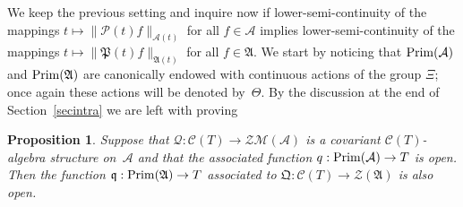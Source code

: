 \documentclass[11pt]{article}
\def\A{{\mathcal A}}
\def\Th{\Theta}
\def\AA{\mathfrak A}
\def\C{\mathcal{C}}
\def\Q{\mathcal Q}
\def\P{\mathcal P}
\def\PP{{\mathfrak P}}
\newtheorem{Proposition}[Theorem]{Proposition}
{\theoremstyle{definition}
\newtheorem{Definition}[Theorem]{Definition}
\newtheorem{Example}[Theorem]{Example}
\newtheorem{Remark}[Theorem]{Remark}
}
\begin{document}
We keep the previous setting and inquire now if lower-semi-continuity of the mappings
$t\mapsto\| \P(t)f\|_{\A(t)}$ for all $f\in\A$ implies lower-semi-continuity of the mappings
$t\mapsto\| \PP(t)f\|_{\AA(t)}$ for all $f\in\AA$. We start by noticing that
${\rm Prim}(\A)$ and ${\rm Prim}(\AA)$
are canonically endowed with continuous actions of the group $\Xi$; once again these actions will be denoted by~$\Th$.
By the discussion at the end of Section~\ref{secintra} we are left with proving

\begin{Proposition}\label{segund}
Suppose that $\Q:\C(T)\to \mathcal Z\mathcal M(\A)$ is a covariant $\C(T)$-algebra structure on~$\A$ and that the associated function
$q:{\rm Prim}(\A)\to T$ is open. Then the function $\mathfrak q:{\rm Prim}(\AA)\to T$ associated to
$\mathfrak Q:\C(T)\to \mathcal Z(\AA)$ is also open.
\end{Proposition}
\end{document}
